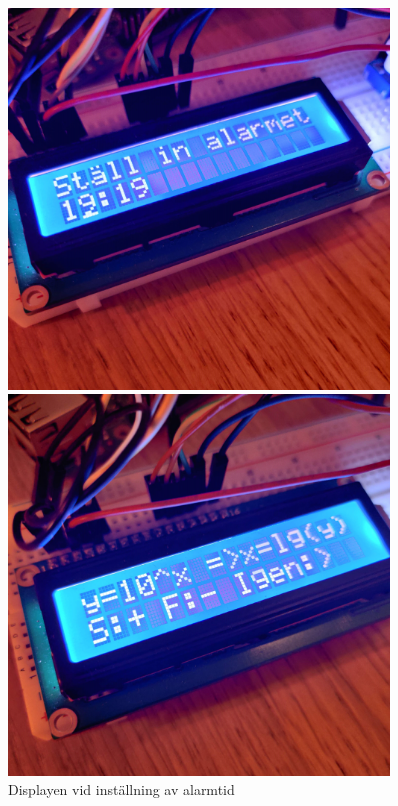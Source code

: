 \begin{figure}[h!] %
    \centering
    \begin{minipage}{0.30\textwidth}
        \centering
        \includegraphics[width=0.9\textwidth]{bilder/stall alarm.jpg} %
        \caption{Displayen vid inställning av alarmtid}
    \end{minipage}\hfill
    \begin{minipage}{0.30\textwidth}
        \centering
        \includegraphics[width=0.9\textwidth]{bilder/sf fraga.jpg} %

\end{minipage}
\end{figure}
